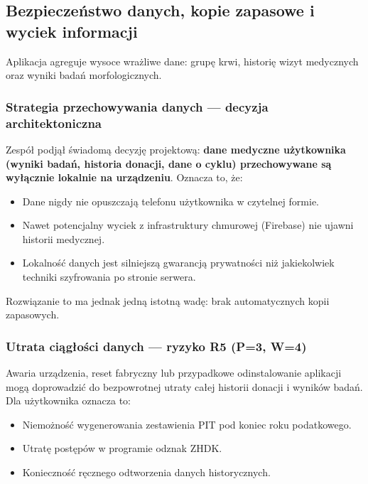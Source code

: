 \documentclass[11pt, a4paper]{article}
\begin{document}
\subsection{Bezpieczeństwo danych, kopie zapasowe i wyciek informacji}

Aplikacja agreguje wysoce wrażliwe dane: grupę krwi, historię wizyt medycznych oraz wyniki badań morfologicznych.

\subsubsection*{Strategia przechowywania danych — decyzja architektoniczna}

Zespół podjął świadomą decyzję projektową: \textbf{dane medyczne użytkownika (wyniki badań, historia donacji, dane o cyklu) przechowywane są wyłącznie lokalnie na urządzeniu}. Oznacza to, że:

\begin{itemize}
  \item Dane nigdy nie opuszczają telefonu użytkownika w czytelnej formie.
  \item Nawet potencjalny wyciek z infrastruktury chmurowej (Firebase) nie ujawni historii medycznej.
  \item Lokalność danych jest silniejszą gwarancją prywatności niż jakiekolwiek techniki szyfrowania po stronie serwera.
\end{itemize}

Rozwiązanie to ma jednak jedną istotną wadę: brak automatycznych kopii zapasowych.

\subsubsection*{Utrata ciągłości danych — ryzyko R5 (P=3, W=4)}

Awaria urządzenia, reset fabryczny lub przypadkowe odinstalowanie aplikacji mogą doprowadzić do bezpowrotnej utraty całej historii donacji i wyników badań. Dla użytkownika oznacza to:

\begin{itemize}
  \item Niemożność wygenerowania zestawienia PIT pod koniec roku podatkowego.
  \item Utratę postępów w programie odznak ZHDK.
  \item Konieczność ręcznego odtworzenia danych historycznych.
\end{itemize}
\end{document}
